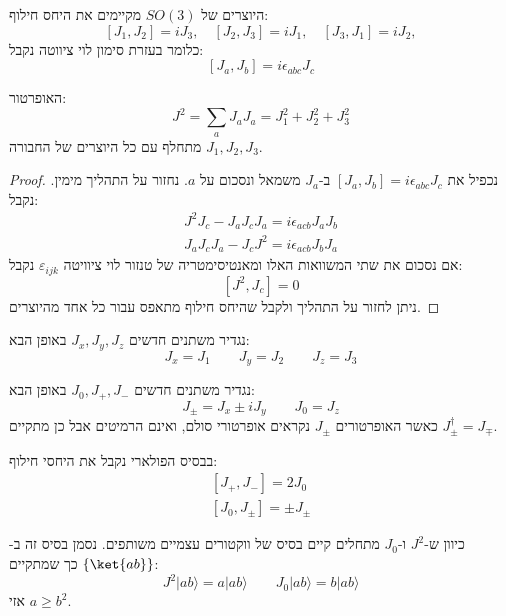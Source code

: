 \documentclass{tstextbook}
\begin{document}
\begin{corollary}
היוצרים של \(SO(3)\) מקיימים את היחס חילוף:
$$[J_{1},J_{2}]=i J_{3},\quad[J_{2},J_{3}]=i J_{1},\quad[J_{3},J_{1}]=i J_{2},$$
כלומר בעזרת סימון לוי ציווטה נקבל:
$$\left[J_a,J_{b}\right]=i\epsilon_{a b c}J_{c}$$

\end{corollary}
\begin{proposition}
האופרטור:
$$J^{2}=\sum_{a}J_{a}J_{a}=J_{1}^{2}+J_{2}^{2}+J_{3}^{2}$$
מתחלף עם כל היוצרים של החבורה \(J_{1},J_{2},J_{3}\).

\end{proposition}
\begin{proof}
נכפיל את \(\left[J_a,J_{b}\right]=i\epsilon_{a b c}J_{c}\) ב-\(J_{a}\) משמאל ונסכום על \(a\). נחזור על התהליך מימין. נקבל:
\begin{gather*}{{J^{2}J_{c}-J_{a}J_{c}J_{a}}}{{=}}{{i\epsilon_{a c b}J_{a}J_{b}}}\\ {{J_{a}J_{c}J_{a}-J_{c}J^{2}}}{{=}}{{i\epsilon_{a c b}J_{b}J_{a}}} 
\end{gather*}
אם נסכום את שתי המשוואות האלו ומאנטיסימטריה של טנזור לוי ציוויטה \(\varepsilon_{ijk}\) נקבל:
$$[J^{2},J_{c}]=0$$
ניתן לחזור על התהליך ולקבל שהיחס חילוף מתאפס עבור כל אחד מהיוצרים.

\end{proof}
\begin{definition}
נגדיר משתנים חדשים \(J_{x},J_{y},J_{z}\) באופן הבא:
$$J_{x}=J_{1} \qquad J_{y}=J_{2} \qquad  J_{z}=J_{3}$$

\end{definition}
\begin{definition}
נגדיר משתנים חדשים \(J_{0},J_{+},J_{-}\) באופן הבא:
$$J_{\pm}=J_{x}\pm i J_{y}\qquad J_{0}=J_{z}$$
כאשר האופרטורים \(J_{\pm}\) נקראים אופרטורי סולם, ואינם הרמיטים אבל כן מתקיים \(J_{\pm}^{\dagger}=J_{\mp}\).

\end{definition}
\begin{corollary}
בבסיס הפולארי נקבל את היחסי חילוף:
\begin{gather*}{{\left[J_{+},J_{-}\right]}}{{=}}{{2J_{0}}}\\ {{\left[J_{0},J_{\pm}\right]}}{{=}}{{\pm J_{\pm}}}  
\end{gather*}

\end{corollary}
\begin{proposition}
כיוון ש-\(J^{2}\) ו-\(J_{0}\) מתחלים קיים בסיס של ווקטורים עצמיים משותפים. נסמן בסיס זה ב-\(\left\{  \ket{ab}  \right\}\) כך שמתקיים:
$$J^{2}|a b\rangle=a|a b\rangle\qquad J_{0}|a b\rangle=b|a b\rangle$$
אזי \(a\geq b^{2}\).

\end{proposition}
\end{document}
